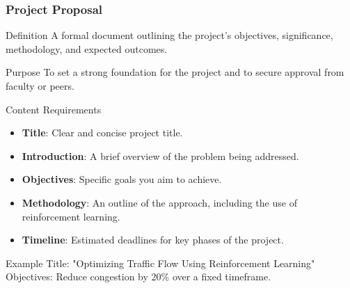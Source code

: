\documentclass[aspectratio=169]{beamer}
\begin{document}
\begin{frame}[fragile]
    \frametitle{Project Proposal}
    \begin{block}{Definition}
        A formal document outlining the project's objectives, significance, methodology, and expected outcomes.
    \end{block}
    \begin{block}{Purpose}
        To set a strong foundation for the project and to secure approval from faculty or peers.
    \end{block}
    \begin{block}{Content Requirements}
        \begin{itemize}
            \item \textbf{Title}: Clear and concise project title.
            \item \textbf{Introduction}: A brief overview of the problem being addressed.
            \item \textbf{Objectives}: Specific goals you aim to achieve.
            \item \textbf{Methodology}: An outline of the approach, including the use of reinforcement learning.
            \item \textbf{Timeline}: Estimated deadlines for key phases of the project.
        \end{itemize}
    \end{block}
    \begin{block}{Example}
        Title: "Optimizing Traffic Flow Using Reinforcement Learning" \\
        Objectives: Reduce congestion by 20\% over a fixed timeframe.
    \end{block}
\end{frame}
\end{document}
